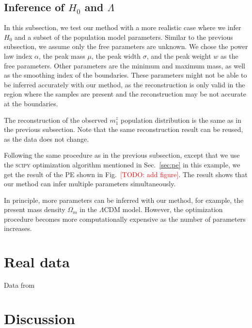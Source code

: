 \documentclass[twocolumn]{aastex631}
\newcommand{\todo}[1]{\textcolor{red}{[TODO: #1]}}
\begin{document}
\subsection{Inference of $H_0$ and $\Lambda$}
\label{sec:inference_multi}

In this subsection, we test our method with a more realistic case where we infer $H_0$ and a subset of the population model parameters.
Similar to the previous subsection, we assume only the free parameters are unknown.
We chose the power law index $\alpha$, the peak mass $\mu$, the peak width $\sigma$, and the peak weight $w$ as the free parameters.
Other parameters are the minimum and maximum mass, as well as the smoothing index of the boundaries.
These parameters might not be able to be inferred accurately with our method, as the reconstruction is only valid in the region where the samples are present and the reconstruction may be not accurate at the boundaries.

The reconstruction of the observed $m^z_1$ population distribution is the same as in the previous subsection.
Note that the same reconstruction result can be reused, as the data does not change.

Following the same procedure as in the previous subsection, except that we use the \textsc{scipy} optimization algorithm mentioned in Sec.~\ref{sec:pe} in this example, we get the result of the \ac{PE} shown in Fig.~\todo{add figure}.
The result shows that our method can infer multiple parameters simultaneously.

In principle, more parameters can be inferred with our method, for example, the present mass density $\Omega_m$ in the $\Lambda$CDM model.
However, the optimization procedure becomes more computationally expensive as the number of parameters increases.

\section{Real data}
\label{sec:real_data}

Data from \citet{LIGOScientific:2019lzm, KAGRA:2023pio}



\section{Discussion}
\label{sec:discussion}
\end{document}
